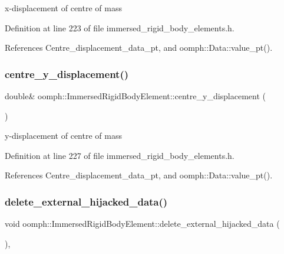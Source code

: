 x-\/displacement of centre of mass 



Definition at line 223 of file immersed\+\_\+rigid\+\_\+body\+\_\+elements.\+h.



References Centre\+\_\+displacement\+\_\+data\+\_\+pt, and oomph\+::\+Data\+::value\+\_\+pt().

\mbox{\label{classoomph_1_1ImmersedRigidBodyElement_a61ffdb07b3db3936f83c3abef3d322d7}} 
\subsubsection{\texorpdfstring{centre\+\_\+y\+\_\+displacement()}{centre\_y\_displacement()}}
{\footnotesize\ttfamily double\& oomph\+::\+Immersed\+Rigid\+Body\+Element\+::centre\+\_\+y\+\_\+displacement (\begin{DoxyParamCaption}{ }\end{DoxyParamCaption})\hspace{0.3cm}{\ttfamily [inline]}}



y-\/displacement of centre of mass 



Definition at line 227 of file immersed\+\_\+rigid\+\_\+body\+\_\+elements.\+h.



References Centre\+\_\+displacement\+\_\+data\+\_\+pt, and oomph\+::\+Data\+::value\+\_\+pt().

\mbox{\label{classoomph_1_1ImmersedRigidBodyElement_a5d9b6718a4d1b92c8849861224c11cc4}} 
\subsubsection{\texorpdfstring{delete\+\_\+external\+\_\+hijacked\+\_\+data()}{delete\_external\_hijacked\_data()}}
{\footnotesize\ttfamily void oomph\+::\+Immersed\+Rigid\+Body\+Element\+::delete\+\_\+external\+\_\+hijacked\+\_\+data (\begin{DoxyParamCaption}{ }\end{DoxyParamCaption})\hspace{0.3cm}{\ttfamily [inline]}, {\ttfamily [private]}}



